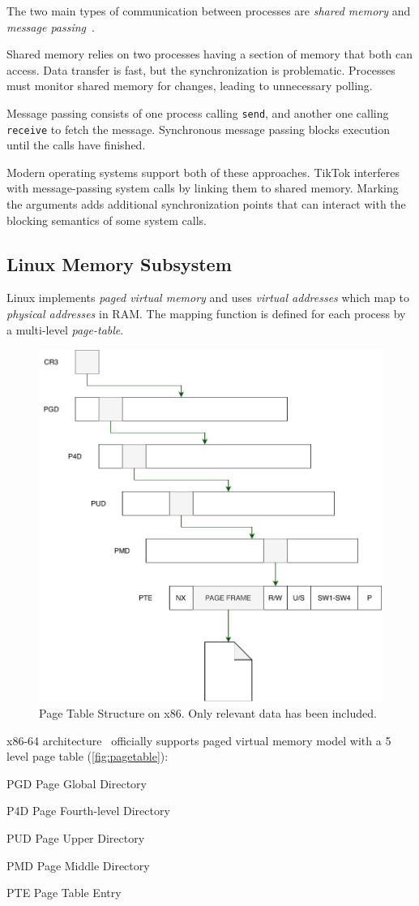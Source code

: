 \documentclass[conference]{IEEEtran}
\newcommand{\sysname}{TikTok}
\begin{document}
The two main types of communication between processes are \emph{shared memory} 
and \emph{message passing}~\cite{silberschatz2018operating}.

Shared memory relies on two processes having a section of memory that both can 
access. Data transfer is fast, but the synchronization is problematic. 
Processes must monitor shared memory for changes, leading to unnecessary
polling.

Message passing consists of one process calling \texttt{send}, and another one
calling \texttt{receive} to fetch the message. Synchronous message passing
blocks execution until the calls have finished.

Modern operating systems support both of these approaches. \sysname{} interferes
with message-passing system calls by linking them to shared memory. Marking the
arguments adds additional synchronization points that can interact with the
blocking semantics of some system calls.

\subsection{Linux Memory Subsystem}
\label{subsec:vm}

Linux implements \emph{paged virtual memory} and uses \emph{virtual addresses}
which map to \emph{physical addresses} in RAM. The mapping function is defined
for each process by a multi-level \emph{page-table}.

\begin{figure}[]
  \centering
  \includegraphics[width = .35 \textwidth]{img/pagetable.pdf}
  \caption{Page Table Structure on x86. Only relevant data has been included.}
  \label{fig:pagetable}
\end{figure}
x86-64 architecture~\cite{intel64and} officially supports paged virtual memory model with a 5 
level page table (\autoref{fig:pagetable}):
\begin{LaTeXdescription}
    \item[PGD] Page Global Directory
    \item[P4D] Page Fourth-level Directory
    \item[PUD] Page Upper Directory
    \item[PMD] Page Middle Directory
    \item[PTE] Page Table Entry
\end{LaTeXdescription}
\end{document}
